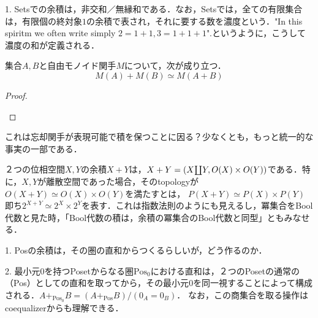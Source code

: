 \documentclass[uplatex, 12pt, dvipdfmx]{jsarticle}
\begin{document}
\begin{example}
    1. Setsでの余積は，非交和／無縁和である．なお，Setsでは，全ての有限集合は，有限個の終対象$1$の余積で表され，それに要する数を濃度という．"In this spiritm we often write simply $2=1+1,3=1+1+1$".というように，こうして濃度の和が定義される．
\end{example}

\begin{example}[具体圏での直和の構成]
    \begin{proposition*}[自由関手は余積を保つ]
        集合$A,B$と自由モノイド関手$M$について，次が成り立つ．
        \[ M(A)+M(B)\simeq M(A+B) \]
    \end{proposition*}
    \begin{proof}　

        \begin{center}
        \end{center}
    \end{proof}
    \begin{remark*}
        これは忘却関手が表現可能で積を保つことに因る？少なくとも，もっと統一的な事実の一部である．
    \end{remark*}
\end{example}

\begin{example}[Topにて]
    ２つの位相空間$X,Y$の余積$X+Y$は，$X+Y=(X\rotatebox[origin=c]{180}{$\prod$} Y,O(X)\times O(Y))$である．特に，$X,Y$が離散空間であった場合，そのtopologyが$O(X+Y)\simeq O(X)\times O(Y)$を満たすとは，
    $P(X+Y)\simeq P(X)\times P(Y)$即ち$2^{X+Y}\simeq 2^X\times 2^Y$を表す．これは指数法則のようにも見えるし，冪集合をBool代数と見た時，「Bool代数の積は，余積の冪集合のBool代数と同型」ともみなせる．
\end{example}

\begin{example*}[Posにて]
    1. Posの余積は，その圏の直和からつくるらしいが，どう作るのか．

    2. 最小元$0$を持つPosetからなる圏$\mathrm{Pos}_0$における直和は，２つのPosetの通常の（Pos）としての直和を取ってから，その最小元$0$を同一視することによって構成される．$A+_{\mathrm{Pos}_0}B=(A+_{\mathrm{Pos}}B)/(0_A=0_B)$．
    なお，この商集合を取る操作はcoequalizerからも理解できる．
\end{example*}
\end{document}
